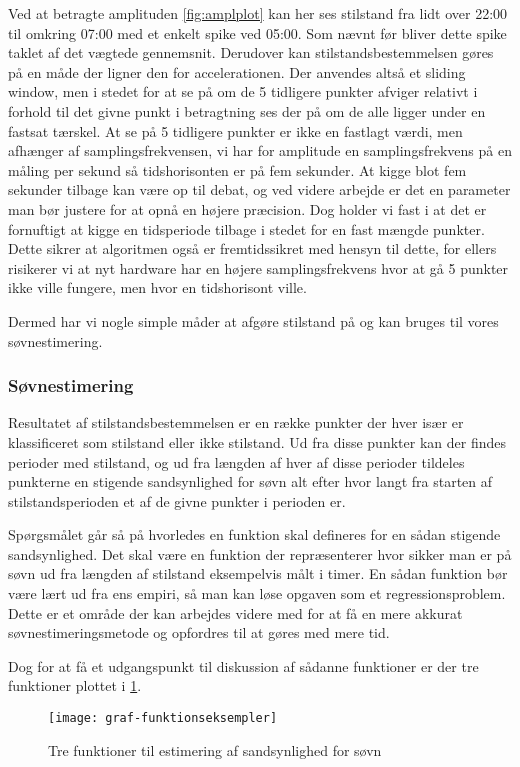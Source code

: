 Ved at betragte amplituden \cref{fig:amplplot} kan her ses stilstand fra lidt over 22:00 til omkring 07:00 med et enkelt spike ved 05:00.
Som nævnt før bliver dette spike taklet af det vægtede gennemsnit.
Derudover kan stilstandsbestemmelsen gøres på en måde der ligner den for accelerationen.
Der anvendes altså et sliding window, men i stedet for at se på om de 5 tidligere punkter afviger relativt i forhold til det givne punkt i betragtning ses der på om de alle ligger under en fastsat tærskel.
At se på 5 tidligere punkter er ikke en fastlagt værdi, men afhænger af samplingsfrekvensen, vi har for amplitude en samplingsfrekvens på en måling per sekund så tidshorisonten er på fem sekunder.
At kigge blot fem sekunder tilbage kan være op til debat, og ved videre arbejde er det en parameter man bør justere for at opnå en højere præcision.
Dog holder vi fast i at det er fornuftigt at kigge en tidsperiode tilbage i stedet for en fast mængde punkter.
Dette sikrer at algoritmen også er fremtidssikret med hensyn til dette, for ellers risikerer vi at nyt hardware har en højere samplingsfrekvens hvor at gå 5 punkter ikke ville fungere, men hvor en tidshorisont ville.

Dermed har vi nogle simple måder at afgøre stilstand på og kan bruges til vores søvnestimering.

\subsubsection{Søvnestimering}
Resultatet af stilstandsbestemmelsen er en række punkter der hver især er klassificeret som stilstand eller ikke stilstand.
Ud fra disse punkter kan der findes perioder med stilstand, og ud fra længden af hver af disse perioder tildeles punkterne en stigende sandsynlighed for søvn alt efter hvor langt fra starten af stilstandsperioden et af de givne punkter i perioden er.

Spørgsmålet går så på hvorledes en funktion skal defineres for en sådan stigende sandsynlighed.
Det skal være en funktion der repræsenterer hvor sikker man er på søvn ud fra længden af stilstand eksempelvis målt i timer.
En sådan funktion bør være lært ud fra ens empiri, så man kan løse opgaven som et regressionsproblem.
Dette er et område der kan arbejdes videre med for at få en mere akkurat søvnestimeringsmetode og opfordres til at gøres med mere tid.

Dog for at få et udgangspunkt til diskussion af sådanne funktioner er der tre funktioner plottet i \cref{fig:trefunc}.
\begin{figure}[h]
	\centering
	\texttt{[image: graf-funktionseksempler]}
	\caption{Tre funktioner til estimering af sandsynlighed for søvn}\label{fig:trefunc}
\end{figure}

